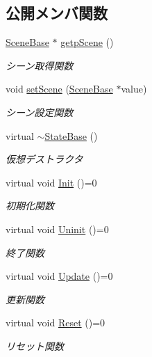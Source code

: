 \subsection*{公開メンバ関数}
\begin{DoxyCompactItemize}
\item 
\mbox{\hyperlink{class_scene_base}{Scene\+Base}} $\ast$ \mbox{\hyperlink{class_scene_base_1_1_state_base_a5333fd722f17c6da71b09afdc56c84b4}{getp\+Scene}} ()
\begin{DoxyCompactList}\small\item\em シーン取得関数 \end{DoxyCompactList}\item 
void \mbox{\hyperlink{class_scene_base_1_1_state_base_adfb19da59b938832387aa10528bedb44}{set\+Scene}} (\mbox{\hyperlink{class_scene_base}{Scene\+Base}} $\ast$value)
\begin{DoxyCompactList}\small\item\em シーン設定関数 \end{DoxyCompactList}\item 
virtual \mbox{\hyperlink{class_scene_base_1_1_state_base_afc993757f908babc872063e1e2465e3e}{$\sim$\+State\+Base}} ()
\begin{DoxyCompactList}\small\item\em 仮想デストラクタ \end{DoxyCompactList}\item 
virtual void \mbox{\hyperlink{class_scene_base_1_1_state_base_a33350231b039a2178c19beac0211c5b8}{Init}} ()=0
\begin{DoxyCompactList}\small\item\em 初期化関数 \end{DoxyCompactList}\item 
virtual void \mbox{\hyperlink{class_scene_base_1_1_state_base_a2763fa37e45b39bd8d3bbb735c76c59b}{Uninit}} ()=0
\begin{DoxyCompactList}\small\item\em 終了関数 \end{DoxyCompactList}\item 
virtual void \mbox{\hyperlink{class_scene_base_1_1_state_base_ad2c6c8fd9f020eb02f64f394edee129c}{Update}} ()=0
\begin{DoxyCompactList}\small\item\em 更新関数 \end{DoxyCompactList}\item 
virtual void \mbox{\hyperlink{class_scene_base_1_1_state_base_a2e14a3afece0b1d8db9edcebf514a977}{Reset}} ()=0
\begin{DoxyCompactList}\small\item\em リセット関数 \end{DoxyCompactList}\end{DoxyCompactItemize}
